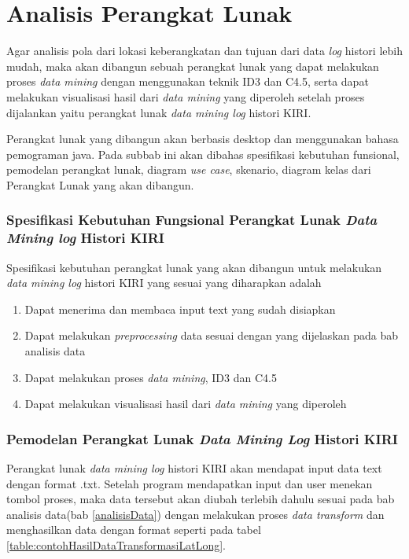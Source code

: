 \section{Analisis Perangkat Lunak}
Agar analisis pola dari lokasi keberangkatan dan tujuan dari data \textsl{log} histori lebih mudah, maka akan dibangun sebuah perangkat lunak yang dapat melakukan proses \textsl{data mining} dengan menggunakan teknik ID3 dan C4.5, serta dapat melakukan visualisasi hasil dari \textsl{data mining} yang diperoleh setelah proses dijalankan yaitu perangkat lunak \textsl{data mining log} histori KIRI. 

Perangkat lunak yang dibangun akan berbasis desktop dan menggunakan bahasa pemograman java. Pada subbab ini akan dibahas spesifikasi kebutuhan funsional, pemodelan perangkat lunak, diagram \textsl{use case}, skenario, diagram kelas dari Perangkat Lunak yang akan dibangun.

\subsubsection{Spesifikasi Kebutuhan Fungsional Perangkat Lunak \textsl{Data Mining log} Histori KIRI}
Spesifikasi kebutuhan perangkat lunak yang akan dibangun untuk melakukan \textsl{data mining log} histori KIRI yang sesuai yang diharapkan adalah
\begin{enumerate}
	\item Dapat menerima dan membaca input text yang sudah disiapkan
	\item Dapat melakukan \textsl{preprocessing} data sesuai dengan yang dijelaskan pada bab analisis data
	\item Dapat melakukan proses \textsl{data mining}, ID3 dan C4.5
	\item Dapat melakukan visualisasi hasil dari \textsl{data mining} yang diperoleh
\end{enumerate}

\subsubsection{Pemodelan Perangkat Lunak \textsl{Data Mining Log} Histori KIRI}
Perangkat lunak \textsl{data mining log} histori KIRI akan mendapat input data text dengan format .txt. Setelah program mendapatkan input dan user menekan tombol proses, maka data tersebut akan diubah terlebih dahulu sesuai pada bab analisis data(bab \ref{analisisData}) dengan melakukan proses \textsl{data transform} dan menghasilkan data dengan format seperti pada tabel \ref{table:contohHasilDataTransformasiLatLong}.


